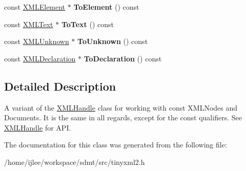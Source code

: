 \begin{DoxyCompactItemize}
\mbox{\label{classtinyxml2_1_1_x_m_l_const_handle_a4dba53c6e201d412e915620feaaa56f3}} 
const \hyperlink{classtinyxml2_1_1_x_m_l_element}{X\+M\+L\+Element} $\ast$ {\bfseries To\+Element} () const
\item 
\mbox{\label{classtinyxml2_1_1_x_m_l_const_handle_a80e24d90d476005aa35602a665358e2d}} 
const \hyperlink{classtinyxml2_1_1_x_m_l_text}{X\+M\+L\+Text} $\ast$ {\bfseries To\+Text} () const
\item 
\mbox{\label{classtinyxml2_1_1_x_m_l_const_handle_a4395e5feaba7b456a81ca274880ea3d3}} 
const \hyperlink{classtinyxml2_1_1_x_m_l_unknown}{X\+M\+L\+Unknown} $\ast$ {\bfseries To\+Unknown} () const
\item 
\mbox{\label{classtinyxml2_1_1_x_m_l_const_handle_a55e306d105fa80d626041e4d3b77b716}} 
const \hyperlink{classtinyxml2_1_1_x_m_l_declaration}{X\+M\+L\+Declaration} $\ast$ {\bfseries To\+Declaration} () const
\end{DoxyCompactItemize}


\subsection{Detailed Description}
A variant of the \hyperlink{classtinyxml2_1_1_x_m_l_handle}{X\+M\+L\+Handle} class for working with const X\+M\+L\+Nodes and Documents. It is the same in all regards, except for the \textquotesingle{}const\textquotesingle{} qualifiers. See \hyperlink{classtinyxml2_1_1_x_m_l_handle}{X\+M\+L\+Handle} for A\+PI. 

The documentation for this class was generated from the following file\+:\begin{DoxyCompactItemize}
\item 
/home/ijlee/workspace/sdmt/src/tinyxml2.\+h\end{DoxyCompactItemize}
